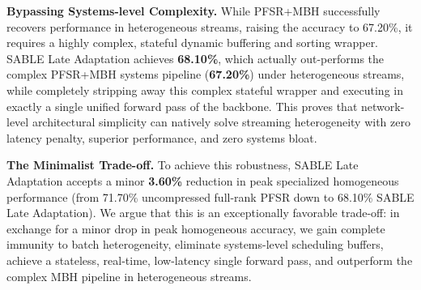 \textbf{Bypassing Systems-level Complexity.} While PFSR+MBH successfully recovers performance in heterogeneous streams, raising the accuracy to 67.20\%, it requires a highly complex, stateful dynamic buffering and sorting wrapper. SABLE Late Adaptation achieves \textbf{68.10\%}, which actually out-performs the complex PFSR+MBH systems pipeline (\textbf{67.20\%}) under heterogeneous streams, while completely stripping away this complex stateful wrapper and executing in exactly a single unified forward pass of the backbone. This proves that network-level architectural simplicity can natively solve streaming heterogeneity with zero latency penalty, superior performance, and zero systems bloat.

\textbf{The Minimalist Trade-off.} To achieve this robustness, SABLE Late Adaptation accepts a minor \textbf{3.60\%} reduction in peak specialized homogeneous performance (from 71.70\% uncompressed full-rank PFSR down to 68.10\% SABLE Late Adaptation). We argue that this is an exceptionally favorable trade-off: in exchange for a minor drop in peak homogeneous accuracy, we gain complete immunity to batch heterogeneity, eliminate systems-level scheduling buffers, achieve a stateless, real-time, low-latency single forward pass, and outperform the complex MBH pipeline in heterogeneous streams.


